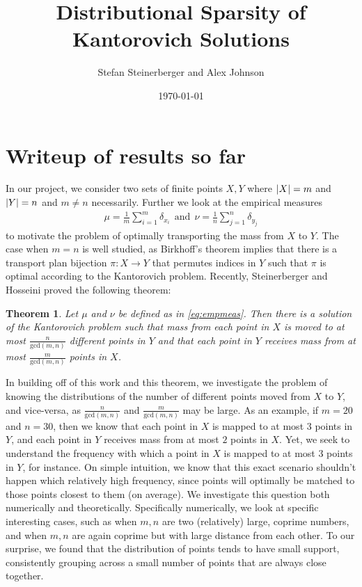 \documentclass[12pt]{article}%
\theoremstyle{plain}
\newtheorem{theorem}{Theorem}
\begin{document}
\title{Distributional Sparsity of Kantorovich Solutions}

\author{Stefan Steinerberger and Alex Johnson}
\date{\today}

\maketitle





\section{Writeup of results so far}
\label{Sec: Intro}
In our project, we consider two sets of finite points $X,Y$ where ${\left|X\right|} = m$ and ${\left|Y\right|} = n$ and $m \neq n$ necessarily. Further we look at the empirical measures
\begin{align}\label{eq:empmeas}
  \mu = \frac{1}{m}\sum_{i=1}^{m}\delta_{x_i} ~~\text{and}~~ \nu = \frac{1}{n}\sum_{j=1}^{n}\delta_{y_j}
\end{align}
to motivate the problem of optimally transporting the mass from $X$ to $Y$. The case when $m=n$ is well studied, as Birkhoff's theorem implies that there is a transport plan bijection $\pi: X \to Y$ that permutes indices in $Y$ such that $\pi$ is optimal according to the Kantorovich problem. Recently, Steinerberger and Hosseini proved the following theorem:
\begin{theorem}
  Let $\mu$ and $\nu$ be defined as in \ref{eq:empmeas}. Then there is a solution of the Kantorovich problem such that mass from each point in $X$ is moved to at most $\frac{n}{\mathrm{gcd}(m,n)}$ different points in $Y$ and that each point in $Y$ receives mass from at most $\frac{m}{\mathrm{gcd}(m,n)}$ points in $X$.
\end{theorem}
In building off of this work and this theorem, we investigate the problem of knowing the distributions of the number of different points moved from $X$ to $Y$, and vice-versa, as $\frac{n}{\mathrm{gcd}(m,n)}$ and $\frac{m}{\mathrm{gcd}(m,n)}$ may be large. As an example, if $m=20$ and $n=30$, then we know that each point in $X$ is mapped to at most 3 points in $Y$, and each point in $Y$ receives mass from at most $2$ points in $X$. Yet, we seek to understand the frequency with which a point in $X$ is mapped to at most 3 points in $Y$, for instance. On simple intuition, we know that this exact scenario shouldn't happen which relatively high frequency, since points will optimally be matched to those points closest to them (on average). We investigate this question both numerically and theoretically. Specifically numerically, we look at specific interesting cases, such as when $m,n$ are two (relatively) large, coprime numbers, and when $m,n$ are again coprime but with large distance from each other. To our surprise, we found that the distribution of points tends to have small support, consistently grouping across a small number of points that are always close together.
\end{document}
